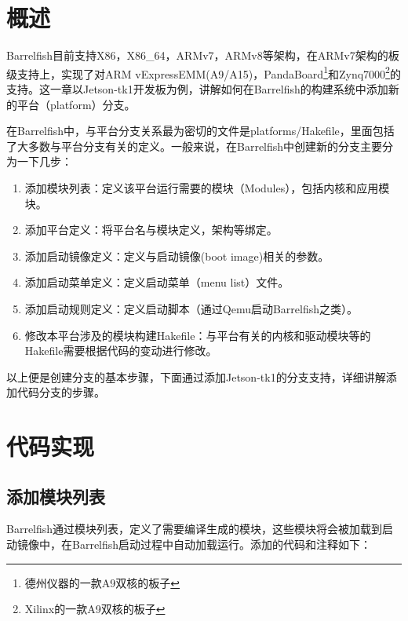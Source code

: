 \documentclass[a4paper, 12pt]{report}
\begin{document}
    \section{概述}
    
    Barrelfish目前支持X86，X86\_64，ARMv7，ARMv8等架构，在ARMv7架构的板级支持上，实现了对ARM vExpressEMM(A9/A15)，PandaBoard\footnote{德州仪器的一款A9双核的板子}和Zynq7000\footnote{Xilinx的一款A9双核的板子}的支持。这一章以Jetson-tk1开发板为例，讲解如何在Barrelfish的构建系统中添加新的平台（platform）分支。
    
    在Barrelfish中，与平台分支关系最为密切的文件是platforms/Hakefile，里面包括了大多数与平台分支有关的定义。一般来说，在Barrelfish中创建新的分支主要分为一下几步：
    
    \begin{enumerate}
        \item 添加模块列表：定义该平台运行需要的模块（Modules），包括内核和应用模块。
        \item 添加平台定义：将平台名与模块定义，架构等绑定。
        \item 添加启动镜像定义：定义与启动镜像(boot image)相关的参数。
        \item 添加启动菜单定义：定义启动菜单（menu list）文件。
        \item 添加启动规则定义：定义启动脚本（通过Qemu启动Barrelfish之类）。
        \item 修改本平台涉及的模块构建Hakefile：与平台有关的内核和驱动模块等的Hakefile需要根据代码的变动进行修改。
    \end{enumerate}
    
    以上便是创建分支的基本步骤，下面通过添加Jetson-tk1的分支支持，详细讲解添加代码分支的步骤。
    
    \section{代码实现}
    
    \subsection{添加模块列表}\label{subsec-module}
    
    Barrelfish通过模块列表，定义了需要编译生成的模块，这些模块将会被加载到启动镜像中，在Barrelfish启动过程中自动加载运行。添加的代码和注释如下：
    
\end{document}
